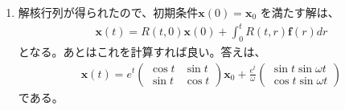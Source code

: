 \documentclass[fleqn]{jsarticle}
\begin{document}
\begin{enumerate}
\item 解核行列が得られたので、初期条件$\boldsymbol{x}(0)=\boldsymbol{x}_{0}$
を満たす解は、
\begin{eqnarray}
\boldsymbol{x}(t)=R(t,0)\boldsymbol{x}(0)
+\int_{0}^{t}R(t,r)\boldsymbol{f}(r)dr
\end{eqnarray}
となる。あとはこれを計算すれば良い。答えは、
\begin{eqnarray}
\boldsymbol{x}(t)=e^{t}\left(
\begin{array}{cc}
\cos t & \sin t\\
\sin t & \cos t
\end{array}\right)\boldsymbol{x}_{0}
+\frac{e^{t}}{\omega}\left(
\begin{array}{c}
\sin t\sin\omega t\\
\cos t\sin\omega t
\end{array}\right)
\end{eqnarray}
である。
\end{enumerate}
\end{document}
